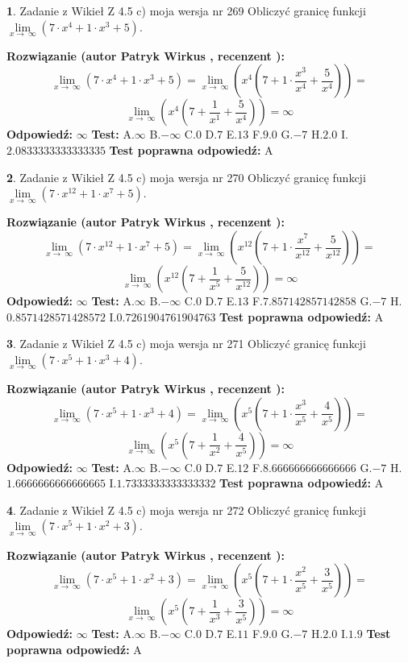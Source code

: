 \documentclass[12pt, a4paper]{article}
\theoremstyle{definition} %
\newtheorem{zad}{}
\newcommand{\zadStart}[1]{\begin{zad}#1\newline}
\newcommand{\zadStop}{\end{zad}}
\newcommand{\rozwStart}[2]{\noindent \textbf{Rozwiązanie (autor #1 , recenzent #2): }\newline}
\newcommand{\rozwStop}{\newline}
\newcommand{\odpStart}{\noindent \textbf{Odpowiedź:}\newline}
\newcommand{\odpStop}{\newline}
\newcommand{\testStart}{\noindent \textbf{Test:}\newline}
\newcommand{\testStop}{\newline}
\newcommand{\kluczStart}{\noindent \textbf{Test poprawna odpowiedź:}\newline}
\newcommand{\kluczStop}{\newline}
\begin{document}
\zadStart{Zadanie z Wikieł Z 4.5 c) moja wersja nr 269}
Obliczyć granicę funkcji  $\lim\limits_{x\to\ \infty}(7 \cdot x^{4}+1 \cdot x^{3}+5)$.
\zadStop
\rozwStart{Patryk Wirkus}{}
$$\lim\limits_{x\to\ \infty}(7 \cdot x^{4}+1 \cdot x^{3}+5) = \lim\limits_{x\to\ \infty}(x^{4}(7 +1 \cdot \frac{x^{3}}{x^{4}}+\frac{5}{x^{4}})) =$$ $$\lim\limits_{x\to\ \infty}(x^{4}(7 +\frac{1}{x^{1}}+\frac{5}{x^{4}})) =\infty$$
\rozwStop
\odpStart
$\infty$
\odpStop
\testStart
A.$\infty$ B.$-\infty$ C.$0$ D.$7$ E.$13$
F.$9.0$ G.$-7$
H.$2.0$
I.$2.0833333333333335$
\testStop
\kluczStart
A
\kluczStop



\zadStart{Zadanie z Wikieł Z 4.5 c) moja wersja nr 270}
Obliczyć granicę funkcji  $\lim\limits_{x\to\ \infty}(7 \cdot x^{12}+1 \cdot x^{7}+5)$.
\zadStop
\rozwStart{Patryk Wirkus}{}
$$\lim\limits_{x\to\ \infty}(7 \cdot x^{12}+1 \cdot x^{7}+5) = \lim\limits_{x\to\ \infty}(x^{12}(7 +1 \cdot \frac{x^{7}}{x^{12}}+\frac{5}{x^{12}})) =$$ $$\lim\limits_{x\to\ \infty}(x^{12}(7 +\frac{1}{x^{5}}+\frac{5}{x^{12}})) =\infty$$
\rozwStop
\odpStart
$\infty$
\odpStop
\testStart
A.$\infty$ B.$-\infty$ C.$0$ D.$7$ E.$13$
F.$7.857142857142858$ G.$-7$
H.$0.8571428571428572$
I.$0.7261904761904763$
\testStop
\kluczStart
A
\kluczStop



\zadStart{Zadanie z Wikieł Z 4.5 c) moja wersja nr 271}
Obliczyć granicę funkcji  $\lim\limits_{x\to\ \infty}(7 \cdot x^{5}+1 \cdot x^{3}+4)$.
\zadStop
\rozwStart{Patryk Wirkus}{}
$$\lim\limits_{x\to\ \infty}(7 \cdot x^{5}+1 \cdot x^{3}+4) = \lim\limits_{x\to\ \infty}(x^{5}(7 +1 \cdot \frac{x^{3}}{x^{5}}+\frac{4}{x^{5}})) =$$ $$\lim\limits_{x\to\ \infty}(x^{5}(7 +\frac{1}{x^{2}}+\frac{4}{x^{5}})) =\infty$$
\rozwStop
\odpStart
$\infty$
\odpStop
\testStart
A.$\infty$ B.$-\infty$ C.$0$ D.$7$ E.$12$
F.$8.666666666666666$ G.$-7$
H.$1.6666666666666665$
I.$1.7333333333333332$
\testStop
\kluczStart
A
\kluczStop



\zadStart{Zadanie z Wikieł Z 4.5 c) moja wersja nr 272}
Obliczyć granicę funkcji  $\lim\limits_{x\to\ \infty}(7 \cdot x^{5}+1 \cdot x^{2}+3)$.
\zadStop
\rozwStart{Patryk Wirkus}{}
$$\lim\limits_{x\to\ \infty}(7 \cdot x^{5}+1 \cdot x^{2}+3) = \lim\limits_{x\to\ \infty}(x^{5}(7 +1 \cdot \frac{x^{2}}{x^{5}}+\frac{3}{x^{5}})) =$$ $$\lim\limits_{x\to\ \infty}(x^{5}(7 +\frac{1}{x^{3}}+\frac{3}{x^{5}})) =\infty$$
\rozwStop
\odpStart
$\infty$
\odpStop
\testStart
A.$\infty$ B.$-\infty$ C.$0$ D.$7$ E.$11$
F.$9.0$ G.$-7$
H.$2.0$
I.$1.9$
\testStop
\kluczStart
A
\kluczStop
\end{document}
